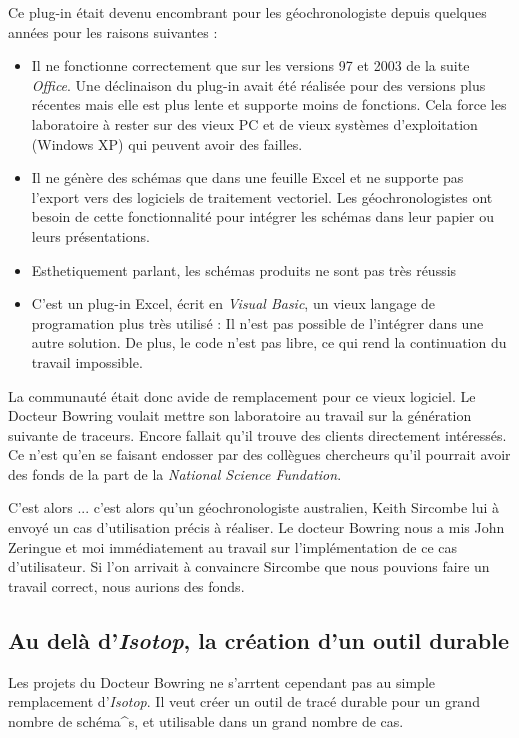 Ce plug-in était devenu encombrant pour les géochronologiste depuis quelques années pour les raisons suivantes :
\begin{itemize}
\item Il ne fonctionne correctement que sur les versions 97 et 2003 de la suite \textit{Office}. Une déclinaison du plug-in avait été réalisée pour des versions plus récentes mais elle est plus lente et supporte moins de fonctions. Cela force les laboratoire à rester sur des vieux PC et de vieux systèmes d'exploitation (Windows XP) qui peuvent avoir des failles.
\item Il ne génère des schémas que dans une feuille Excel et ne supporte pas l'export vers des logiciels de traitement vectoriel. Les géochronologistes ont besoin de cette fonctionnalité pour intégrer les schémas dans leur papier ou leurs présentations.
\item Esthetiquement parlant, les schémas produits ne sont pas très réussis
\item C'est un plug-in Excel, écrit en \textit{Visual Basic}, un vieux langage de programation plus très utilisé : Il n'est pas possible de l'intégrer dans une autre solution. De plus, le code n'est pas libre, ce qui rend la continuation du travail impossible.
\end{itemize}

La communauté était donc avide de remplacement pour ce vieux logiciel. Le Docteur Bowring voulait mettre son laboratoire au travail sur la génération suivante de traceurs. Encore fallait qu'il trouve des clients directement intéressés. Ce n'est qu'en se faisant endosser par des collègues chercheurs qu'il pourrait avoir des fonds de la part de la \textit{National Science Fundation}.

C'est alors ... c'est alors qu'un géochronologiste australien, Keith Sircombe lui à envoyé un cas d'utilisation précis à réaliser. Le docteur Bowring nous a mis John Zeringue et moi immédiatement au travail sur l'implémentation de ce cas d'utilisateur. Si l'on arrivait à convaincre Sircombe que nous pouvions faire un travail correct, nous aurions des fonds.

\subsection{Au delà d'\textit{Isotop}, la création d'un outil durable}
Les projets du Docteur Bowring ne s'arrtent cependant pas au simple remplacement d'\textit{Isotop}. Il veut créer un outil de tracé durable pour un grand nombre de schéma^s, et utilisable dans un grand nombre de cas.

